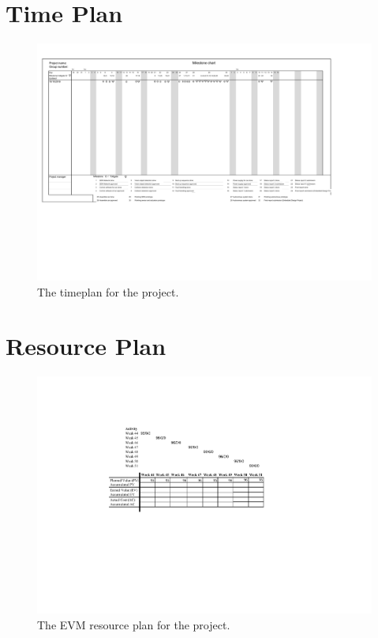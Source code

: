 \documentclass[11pt, titlepage]{article} %
\begin{document}
\section{Time Plan}
\begin{figure}
    \centering
    \includegraphics[width=\textwidth]{timeplan.pdf}
    \caption{The timeplan for the project.}
    \label{fig:timeplan}
\end{figure}
\clearpage

\section{Resource Plan}
\begin{figure}
    \centering
    \includegraphics[scale=0.8]{evm.pdf}
    \caption{The EVM resource plan for the project.}
    \label{fig:evm}
\end{figure}
\clearpage
\end{document}
